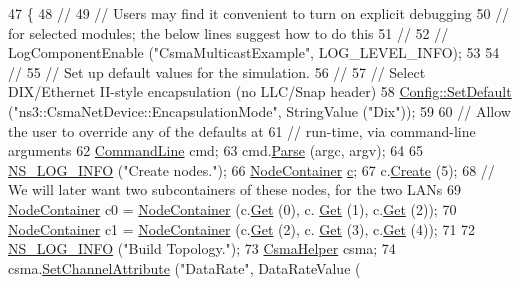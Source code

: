 \begin{DoxyCode}
47 \{
48   \textcolor{comment}{//}
49   \textcolor{comment}{// Users may find it convenient to turn on explicit debugging}
50   \textcolor{comment}{// for selected modules; the below lines suggest how to do this}
51   \textcolor{comment}{//}
52   \textcolor{comment}{// LogComponentEnable ("CsmaMulticastExample", LOG\_LEVEL\_INFO);}
53 
54   \textcolor{comment}{//}
55   \textcolor{comment}{// Set up default values for the simulation.}
56   \textcolor{comment}{//}
57   \textcolor{comment}{// Select DIX/Ethernet II-style encapsulation (no LLC/Snap header)}
58   \hyperlink{group__config_ga2e7882df849d8ba4aaad31c934c40c06}{Config::SetDefault} (\textcolor{stringliteral}{"ns3::CsmaNetDevice::EncapsulationMode"}, StringValue (\textcolor{stringliteral}{"Dix"}));
59 
60   \textcolor{comment}{// Allow the user to override any of the defaults at}
61   \textcolor{comment}{// run-time, via command-line arguments}
62   \hyperlink{classns3_1_1CommandLine}{CommandLine} cmd;
63   cmd.\hyperlink{classns3_1_1CommandLine_a5c10b85b3207e5ecb48d907966923156}{Parse} (argc, argv);
64 
65   \hyperlink{group__logging_gafbd73ee2cf9f26b319f49086d8e860fb}{NS\_LOG\_INFO} (\textcolor{stringliteral}{"Create nodes."});
66   \hyperlink{classns3_1_1NodeContainer}{NodeContainer} \hyperlink{lte_2model_2fading-traces_2fading__trace__generator_8m_ae0323a9039add2978bf5b49550572c7c}{c};
67   c.\hyperlink{classns3_1_1NodeContainer_a787f059e2813e8b951cc6914d11dfe69}{Create} (5);
68   \textcolor{comment}{// We will later want two subcontainers of these nodes, for the two LANs}
69   \hyperlink{classns3_1_1NodeContainer}{NodeContainer} c0 = \hyperlink{classns3_1_1NodeContainer}{NodeContainer} (c.\hyperlink{classns3_1_1NodeContainer_a9ed96e2ecc22e0f5a3d4842eb9bf90bf}{Get} (0), c.
      \hyperlink{classns3_1_1NodeContainer_a9ed96e2ecc22e0f5a3d4842eb9bf90bf}{Get} (1), c.\hyperlink{classns3_1_1NodeContainer_a9ed96e2ecc22e0f5a3d4842eb9bf90bf}{Get} (2));
70   \hyperlink{classns3_1_1NodeContainer}{NodeContainer} c1 = \hyperlink{classns3_1_1NodeContainer}{NodeContainer} (c.\hyperlink{classns3_1_1NodeContainer_a9ed96e2ecc22e0f5a3d4842eb9bf90bf}{Get} (2), c.
      \hyperlink{classns3_1_1NodeContainer_a9ed96e2ecc22e0f5a3d4842eb9bf90bf}{Get} (3), c.\hyperlink{classns3_1_1NodeContainer_a9ed96e2ecc22e0f5a3d4842eb9bf90bf}{Get} (4));
71 
72   \hyperlink{group__logging_gafbd73ee2cf9f26b319f49086d8e860fb}{NS\_LOG\_INFO} (\textcolor{stringliteral}{"Build Topology."});
73   \hyperlink{classns3_1_1CsmaHelper}{CsmaHelper} csma;
74   csma.\hyperlink{classns3_1_1CsmaHelper_a886d900b2fe44433e0b81752dea7e7f1}{SetChannelAttribute} (\textcolor{stringliteral}{"DataRate"}, DataRateValue (

\end{DoxyCode}
